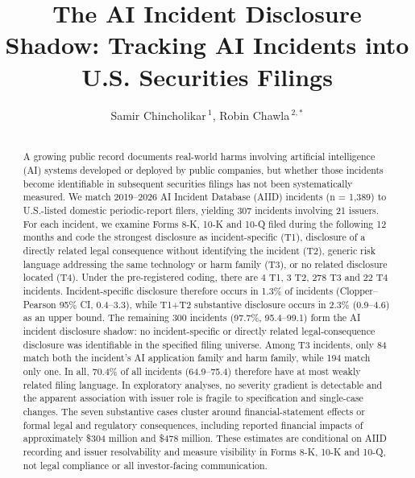 \documentclass[utf8]{FrontiersinHarvard}
\def\firstAuthorLast{Chincholikar {and} Chawla}
\def\Authors{Samir Chincholikar\,$^{1}$, Robin Chawla\,$^{2,*}$}
\begin{document}
\onecolumn
{}

\title[The AI Incident Disclosure Shadow]{The AI Incident Disclosure Shadow: Tracking AI Incidents into U.S. Securities Filings}

\author[\firstAuthorLast ]{\Authors}
\address{}
\correspondance{}
\extraAuth{}

\maketitle

\begin{abstract}
\section{}
A growing public record documents real-world harms involving artificial intelligence (AI) systems developed or deployed by public companies, but whether those incidents become identifiable in subsequent securities filings has not been systematically measured. We match 2019--2026 AI Incident Database (AIID) incidents (n = 1{,}389) to U.S.-listed domestic periodic-report filers, yielding 307 incidents involving 21 issuers. For each incident, we examine Forms 8-K, 10-K and 10-Q filed during the following 12 months and code the strongest disclosure as incident-specific (T1), disclosure of a directly related legal consequence without identifying the incident (T2), generic risk language addressing the same technology or harm family (T3), or no related disclosure located (T4). Under the pre-registered coding, there are 4 T1, 3 T2, 278 T3 and 22 T4 incidents. Incident-specific disclosure therefore occurs in 1.3\% of incidents (Clopper--Pearson 95\% CI, 0.4--3.3), while T1+T2 substantive disclosure occurs in 2.3\% (0.9--4.6) as an upper bound. The remaining 300 incidents (97.7\%, 95.4--99.1) form the AI incident disclosure shadow: no incident-specific or directly related legal-consequence disclosure was identifiable in the specified filing universe. Among T3 incidents, only 84 match both the incident's AI application family and harm family, while 194 match only one. In all, 70.4\% of all incidents (64.9--75.4) therefore have at most weakly related filing language. In exploratory analyses, no severity gradient is detectable and the apparent association with issuer role is fragile to specification and single-case changes. The seven substantive cases cluster around financial-statement effects or formal legal and regulatory consequences, including reported financial impacts of approximately \$304 million and \$478 million. These estimates are conditional on AIID recording and issuer resolvability and measure visibility in Forms 8-K, 10-K and 10-Q, not legal compliance or all investor-facing communication.


\end{abstract}
\end{document}
